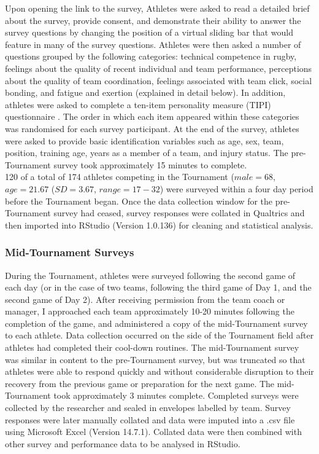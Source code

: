 \documentclass[12pt]{report}
\begin{document}
Upon opening the link to the survey, Athletes were asked to read a detailed brief about the survey, provide consent, and demonstrate their ability to answer the survey questions by changing the position of a virtual sliding bar that would feature in many of the survey questions. Athletes were then asked a number of questions grouped by the following categories: technical competence in rugby, feelings about the quality of recent individual and team performance, perceptions about the quality of team coordination, feelings associated with team click, social bonding, and fatigue and exertion (explained in detail below). In addition, athletes were asked to complete a ten-item personality measure (TIPI) questionnaire  \citep{Gosling2003}. The order in which each item appeared within these categories was randomised for each survey participant. At the end of the survey, athletes were asked to provide basic identification variables such as age, sex, team, position, training age, years as a member of a team, and injury status. The pre-Tournament survey took approximately 15 minutes to complete. \\

120 of a total of 174 athletes competing in the Tournament ($male = 68$, $age = 21.67$ ($SD = 3.67$, $range = 17-32$) were surveyed within a four day period before the Tournament began. Once the data collection window for the pre-Tournament survey had ceased, survey responses were collated in Qualtrics and then imported into RStudio (Version 1.0.136) for cleaning and statistical analysis. \\


    \subsubsection{Mid-Tournament Surveys}

During the Tournament, athletes were surveyed following the second game of each day (or in the case of two teams, following the third game of Day 1, and the second game of Day 2).  After receiving permission from the team coach or manager, I approached each team approximately 10-20 minutes following the completion of the game, and administered a copy of the mid-Tournament survey to each athlete.  Data collection occurred on the side of the Tournament field after athletes had completed their cool-down routines. The mid-Tournament survey was similar in content to the pre-Tournament survey, but was  truncated so that athletes were able to respond quickly and without considerable disruption to their recovery from the previous game or preparation for the next game. The mid-Tournament took approximately 3 minutes complete. Completed surveys were collected by the researcher and sealed in envelopes labelled by team.  Survey responses were later manually collated and data were imputed into a .csv file using Microsoft Excel (Version 14.7.1). Collated data were then combined with other survey and performance data to be analysed in RStudio. \\
\end{document}

